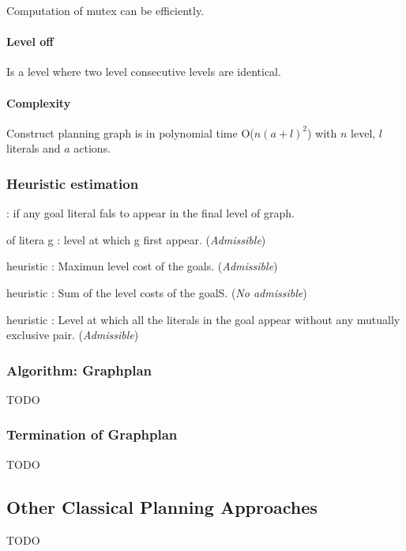Computation of mutex can be efficiently.

\paragraph{Level off}
Is a level where two level consecutive levels are identical.

\paragraph{Complexity}
Construct planning  graph is in  polynomial time O($n(a+l)^2$)  with $n$
level, $l$ literals and $a$ actions.

\subsubsection{Heuristic estimation}
\begin{description}
    \item[Unsolvable] : if any goal literal fals to appear in the final level of graph.
    \item[Level-cost] of litera g : level at which g first appear.
        (\textit{Admissible})
    \item
    \item[Max-level] heuristic : Maximun level cost of the goals. (\textit{Admissible})
    \item[Level sum] heuristic : Sum of the level costs of the goalS. (\textit{No admissible})
    \item[Set-level] heuristic : Level at which all the literals in the goal appear
        without any mutually exclusive pair. (\textit{Admissible})
\end{description}

\subsubsection{Algorithm: Graphplan}
TODO

\subsubsection{Termination of Graphplan}
TODO


\subsection{Other Classical Planning Approaches}
TODO





